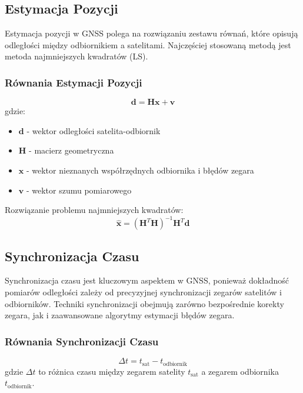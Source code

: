 \subsection{Estymacja Pozycji}
Estymacja pozycji w GNSS polega na rozwiązaniu zestawu równań, które opisują odległości między odbiornikiem a satelitami. Najczęściej stosowaną metodą jest metoda najmniejszych kwadratów (LS).

\subsubsection{Równania Estymacji Pozycji}
\[
\mathbf{d} = \mathbf{H} \mathbf{x} + \mathbf{v}
\]
gdzie:
\begin{itemize}
    \item \( \mathbf{d} \) - wektor odległości satelita-odbiornik
    \item \( \mathbf{H} \) - macierz geometryczna
    \item \( \mathbf{x} \) - wektor nieznanych współrzędnych odbiornika i błędów zegara
    \item \( \mathbf{v} \) - wektor szumu pomiarowego
\end{itemize}

Rozwiązanie problemu najmniejszych kwadratów:
\[
\hat{\mathbf{x}} = (\mathbf{H}^T \mathbf{H})^{-1} \mathbf{H}^T \mathbf{d}
\]

\subsection{Synchronizacja Czasu}
Synchronizacja czasu jest kluczowym aspektem w GNSS, ponieważ dokładność pomiarów odległości zależy od precyzyjnej synchronizacji zegarów satelitów i odbiorników. Techniki synchronizacji obejmują zarówno bezpośrednie korekty zegara, jak i zaawansowane algorytmy estymacji błędów zegara.

\subsubsection{Równania Synchronizacji Czasu}
\[
\Delta t = t_{\text{sat}} - t_{\text{odbiornik}}
\]
gdzie \( \Delta t \) to różnica czasu między zegarem satelity \( t_{\text{sat}} \) a zegarem odbiornika \( t_{\text{odbiornik}} \).
